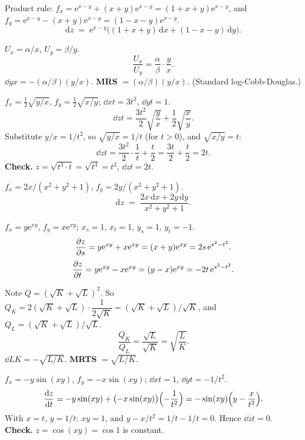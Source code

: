 \begin{solutions}
  \item Product rule: $f_{x}=\mathrm{e}^{x-y}+(x+y)\mathrm{e}^{x-y}
        =(1+x+y)\mathrm{e}^{x-y}$, and
        $f_{y}=\mathrm{e}^{x-y}-(x+y)\mathrm{e}^{x-y}=(1-x-y)\mathrm{e}^{x-y}$.
        \[
          \mathrm{d}z \;=\; \mathrm{e}^{x-y}\bigl((1+x+y)\,\mathrm{d}x
            +(1-x-y)\,\mathrm{d}y\bigr) .
        \]

  \item $U_{x}=\alpha/x$, $U_{y}=\beta/y$.
        \[
          \frac{U_{x}}{U_{y}}=\frac{\alpha}{\beta}\cdot\frac{y}{x} .
        \]
        $\dd{y}{x}=-(\alpha/\beta)(y/x)$.
        \textbf{MRS} $=(\alpha/\beta)(y/x)$. (Standard log-Cobb-Douglas.)

  \item $f_{x}=\tfrac12\sqrt{y/x}$, $f_{y}=\tfrac12\sqrt{x/y}$;
        $\dd{x}{t}=3t^{2}$, $\dd{y}{t}=1$.
        \[
          \dd{z}{t}=\frac{3t^{2}}{2}\sqrt{\frac{y}{x}}
            +\frac{1}{2}\sqrt{\frac{x}{y}} .
        \]
        Substitute $y/x=1/t^{2}$, so $\sqrt{y/x}=1/t$ (for $t>0$), and
        $\sqrt{x/y}=t$:
        \[
          \dd{z}{t}=\frac{3t^{2}}{2}\cdot\frac{1}{t}+\frac{t}{2}
            =\frac{3t}{2}+\frac{t}{2}=2t .
        \]
        \textbf{Check.} $z=\sqrt{t^{3}\cdot t}=\sqrt{t^{4}}=t^{2}$,
        $\dd{z}{t}=2t$. \checkmark

  \item $f_{x}=2x/(x^{2}+y^{2}+1)$, $f_{y}=2y/(x^{2}+y^{2}+1)$.
        \[
          \mathrm{d}z \;=\; \frac{2x\,\mathrm{d}x+2y\,\mathrm{d}y}{x^{2}+y^{2}+1} .
        \]

  \item $f_{x}=y\mathrm{e}^{xy}$, $f_{y}=x\mathrm{e}^{xy}$; $x_{s}=1$,
        $x_{t}=1$, $y_{s}=1$, $y_{t}=-1$.
        \[
          \frac{\partial z}{\partial s}=y\mathrm{e}^{xy}+x\mathrm{e}^{xy}=(x+y)\mathrm{e}^{xy}
            =2s\,\mathrm{e}^{s^{2}-t^{2}} .
        \]
        \[
          \frac{\partial z}{\partial t}=y\mathrm{e}^{xy}-x\mathrm{e}^{xy}=(y-x)\mathrm{e}^{xy}
            =-2t\,\mathrm{e}^{s^{2}-t^{2}} .
        \]

  \item Note $Q=(\sqrt{K}+\sqrt{L})^{2}$. So $Q_{K}=2(\sqrt{K}+\sqrt{L})
        \cdot\dfrac{1}{2\sqrt{K}}=(\sqrt{K}+\sqrt{L})/\sqrt{K}$, and
        $Q_{L}=(\sqrt{K}+\sqrt{L})/\sqrt{L}$.
        \[
          \frac{Q_{K}}{Q_{L}}=\frac{\sqrt{L}}{\sqrt{K}}=\sqrt{\frac{L}{K}} .
        \]
        $\dd{L}{K}=-\sqrt{L/K}$. \textbf{MRTS} $=\sqrt{L/K}$.

  \item $f_{x}=-y\sin(xy)$, $f_{y}=-x\sin(xy)$; $\dd{x}{t}=1$,
        $\dd{y}{t}=-1/t^{2}$.
        \[
          \frac{\mathrm{d}z}{\mathrm{d}t}=-y\sin(xy)+\bigl(-x\sin(xy)\bigr)\Bigl(-\frac{1}{t^{2}}\Bigr)
            =-\sin(xy)\Bigl(y-\frac{x}{t^{2}}\Bigr) .
        \]
        With $x=t$, $y=1/t$: $xy=1$, and $y-x/t^{2}=1/t-1/t=0$. Hence
        $\dd{z}{t}=0$. \textbf{Check.} $z=\cos(xy)=\cos 1$ is constant.
        \checkmark


\end{solutions}
